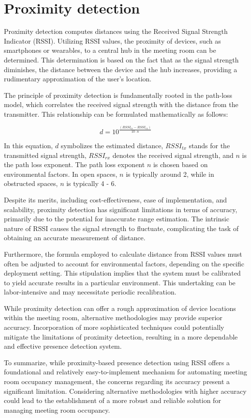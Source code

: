 \section{Proximity detection}\label{sec:proximity_detection}
Proximity detection computes distances using the Received Signal Strength Indicator (RSSI).
Utilizing RSSI values, the proximity of devices, such as smartphones or wearables, to a central hub in the meeting room can be determined. This determination is based on the fact that as the signal strength diminishes, the distance between the device and the hub increases, providing a rudimentary approximation of the user's location.\cite{spachosBLEBeaconsIndoor2020}

The principle of proximity detection is fundamentally rooted in the path-loss model, which correlates the received signal strength with the distance from the transmitter. This relationship can be formulated mathematically as follows:

$$
d = 10^{ \frac{(RSSI_{tx} - RSSI_{rx})}{10 \cdot n}}
$$\cite{spachosBLEBeaconsIndoor2020}

In this equation, \(d\) symbolizes the estimated distance, \(RSSI_{tx}\) stands for the transmitted signal strength, \(RSSI_{rx}\) denotes the received signal strength, and \(n\) is the path loss exponent. The path loss exponent \(n\) is chosen based on environmental factors. In open spaces, \(n\) is typically around 2, while in obstructed spaces, \(n\) is typically 4 - 6.\cite{spachosBLEBeaconsIndoor2020, mathuranathanLogDistancePath2013}

Despite its merits, including cost-effectiveness, ease of implementation, and scalability, proximity detection has significant limitations in terms of accuracy, primarily due to the potential for inaccurate range estimation. The intrinsic nature of RSSI causes the signal strength to fluctuate, complicating the task of obtaining an accurate measurement of distance.\cite{spachosBLEBeaconsIndoor2020}

Furthermore, the formula employed to calculate distance from RSSI values must often be adjusted to account for environmental factors, depending on the specific deployment setting. This stipulation implies that the system must be calibrated to yield accurate results in a particular environment. This undertaking can be labor-intensive and may necessitate periodic recalibration.\cite{spachosBLEBeaconsIndoor2020}

While proximity detection can offer a rough approximation of device locations within the meeting room, alternative methodologies may provide superior accuracy. Incorporation of more sophisticated techniques could potentially mitigate the limitations of proximity detection, resulting in a more dependable and effective presence detection system.

To summarize, while proximity-based presence detection using RSSI offers a foundational and relatively easy-to-implement mechanism for automating meeting room occupancy management, the concerns regarding its accuracy present a significant limitation. Considering alternative methodologies with higher accuracy could lead to the establishment of a more robust and reliable solution for managing meeting room occupancy.
